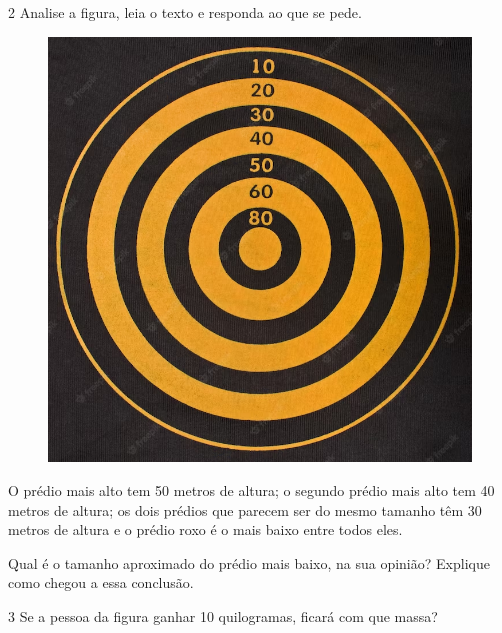 \pagebreak
\num{2} Analise a figura, leia o texto e responda ao que se pede.


\begin{figure}[htpb!]
\includegraphics[width=\textwidth]{./media/image31.png}
\end{figure}

O prédio mais alto tem 50 metros de altura; o segundo prédio mais alto
tem 40 metros de altura; os dois prédios que parecem ser do mesmo
tamanho têm 30 metros de altura e o prédio roxo é o mais baixo entre
todos eles.

Qual é o tamanho aproximado do prédio mais baixo, na sua opinião?
Explique como chegou a essa conclusão.


\pagebreak
\num{3} Se a pessoa da figura ganhar 10 quilogramas, ficará com que massa?


